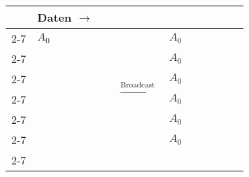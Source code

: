 \begin{figure}[b]%
\label{fig:kolkom}
      \begin{subfigure}[l]{0.87\textwidth}
	\begin{tabular}[]{m{0.2cm} m{0.3cm}|m{0.3cm}|m{0.3cm}|m{0.3cm}|m{0.3cm}|m{0.3cm} m{1.5cm} m{0.3cm}|m{0.3cm}|m{0.3cm}|m{0.3cm}|m{0.3cm}|m{0.3cm}}
	  & \multicolumn{13}{l}{Daten $\longrightarrow$}\\
	  \cline{2-7} \cline{9-14}
	  \multirow{6}{*}{\begin{turn}{-90} Prozesse $\longrightarrow$ \end{turn}}
	  &\multicolumn{1}{|c|}{$A_0$}& & & & &\multicolumn{1}{|m{0.3cm}|}{ } &\multirow{6}{*}{\large $\xrightarrow{\text{Broadcast}}$} & \multicolumn{1}{|c|}{$A_0$}& & & & &\multicolumn{1}{|m{0.3cm}|}{ }\\
	  \cline{2-7} \cline{9-14}
	  &\multicolumn{1}{|c|}{ }& & & & &\multicolumn{1}{|c|}{ }                         & & \multicolumn{1}{|c|}{$A_0$}    & & & & &                \multicolumn{1}{|c|}{ }    \\
	  \cline{2-7} \cline{9-14}
	  &\multicolumn{1}{|c|}{ }& & & & &\multicolumn{1}{|c|}{ }                         & & \multicolumn{1}{|c|}{$A_0$}    & & & & &                \multicolumn{1}{|c|}{ }    \\
	  \cline{2-7} \cline{9-14}
	  &\multicolumn{1}{|c|}{ }& & & & &\multicolumn{1}{|c|}{ }                         & & \multicolumn{1}{|c|}{$A_0$}    & & & & &                \multicolumn{1}{|c|}{ }    \\
	  \cline{2-7} \cline{9-14}
	  &\multicolumn{1}{|c|}{ }& & & & &\multicolumn{1}{|c|}{ }                         & & \multicolumn{1}{|c|}{$A_0$}    & & & & &                \multicolumn{1}{|c|}{ }    \\
	  \cline{2-7} \cline{9-14}
	  &\multicolumn{1}{|c|}{ }& & & & &\multicolumn{1}{|c|}{ }                         & & \multicolumn{1}{|c|}{$A_0$}    & & & & &                \multicolumn{1}{|c|}{ }    \\
	  \cline{2-7} \cline{9-14}
	\end{tabular}
      \end{subfigure}
      

\end{figure}
